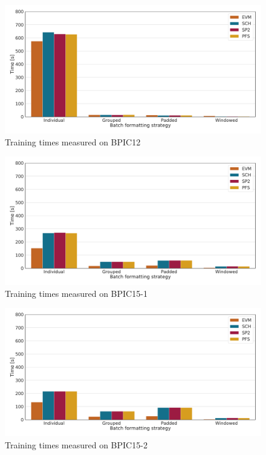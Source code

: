 \begin{figure}
    \centering
    \includegraphics[width=\textwidth]{gfx/bpic2012/train_timings.pdf}
    \caption{Training times measured on BPIC12}
    \label{fig:BPIC12-training-timings}
\end{figure}
\begin{figure}
    \centering
    \includegraphics[width=\textwidth]{gfx/bpic2015_1/train_timings.pdf}
    \caption{Training times measured on BPIC15-1}
    \label{fig:BPIC15-1-training-timings}
\end{figure}
\begin{figure}
    \centering
    \includegraphics[width=\textwidth]{gfx/bpic2015_2/train_timings.pdf}
    \caption{Training times measured on BPIC15-2}
    \label{fig:BPIC15-2-training-timings}
\end{figure}
